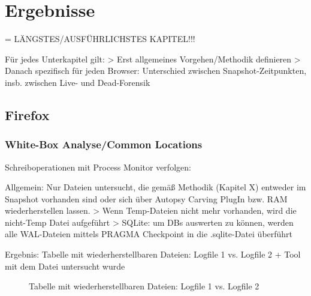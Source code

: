\chapter{Ergebnisse}

= LÄNGSTES/AUSFÜHRLICHSTES KAPITEL!!!

Für jedes Unterkapitel gilt: 
> Erst allgemeines Vorgehen/Methodik definieren
> Danach spezifisch für jeden Browser: Unterschied zwischen Snapshot-Zeitpunkten, insb. zwischen Live- und Dead-Forensik

\section{Firefox}

\subsection*{White-Box Analyse/Common Locations}

Schreiboperationen mit Process Monitor verfolgen:

Allgemein: Nur Dateien untersucht, die gemäß Methodik (Kapitel X) entweder im Snapshot vorhanden sind oder sich über Autopsy Carving PlugIn bzw. RAM wiederherstellen lassen.
> Wenn Temp-Dateien nicht mehr vorhanden, wird die nicht-Temp Datei aufgeführt
> SQLite: um DBs auswerten zu können, werden alle WAL-Dateien mittels PRAGMA Checkpoint in die .sqlite-Datei überführt

Ergebnis: Tabelle mit wiederherstellbaren Dateien: Logfile 1 vs. Logfile 2 + Tool mit dem Datei untersucht wurde
\begin{figure}[h!]
	\caption{Tabelle mit wiederherstellbaren Dateien: Logfile 1 vs. Logfile 2}
\end{figure}

